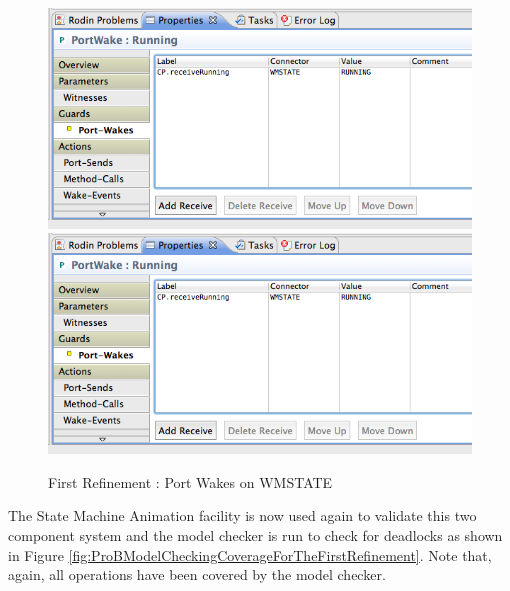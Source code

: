  \begin{figure}[!htbp]
  \centering
  \ifplastex
  \includegraphics[width=1024]{figures/image23.png}
  \else
  \includegraphics[width=1\textwidth]{figures/image23.png}
  \fi
  \caption{First Refinement : Port Wakes on WMSTATE}
  \label{fig:FirstRefinementPortWakesOnWMSTATE}
\end{figure} 

The State Machine Animation facility is now used again to validate this two component system and the model checker is run to check for deadlocks as shown in Figure \ref{fig:ProBModelCheckingCoverageForTheFirstRefinement}. Note that, again, all operations have been covered by the model checker.
 
